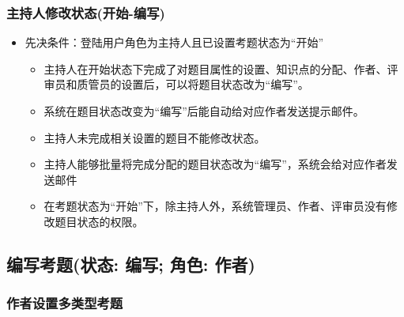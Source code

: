 \documentclass[hyperref, a4paper]{ctexart}
\providecommand{\tightlist}{%
  \setlength{\itemsep}{0pt}\setlength{\parskip}{0pt}}
\begin{document}
\hypertarget{ux4e3bux6301ux4ebaux4feeux6539ux72b6ux6001ux5f00ux59cb-ux7f16ux5199}{%
\subsubsection{主持人修改状态(开始-编写)}\label{ux4e3bux6301ux4ebaux4feeux6539ux72b6ux6001ux5f00ux59cb-ux7f16ux5199}}

\begin{itemize}
\tightlist
\item
  先决条件：登陆用户角色为主持人且已设置考题状态为``开始''

  \begin{itemize}
  \tightlist
  \item
    主持人在开始状态下完成了对题目属性的设置、知识点的分配、作者、评审员和质管员的设置后，可以将题目状态改为``编写''。
  \item
    系统在题目状态改变为``编写''后能自动给对应作者发送提示邮件。
  \item
    主持人未完成相关设置的题目不能修改状态。
  \item
    主持人能够批量将完成分配的题目状态改为``编写''，系统会给对应作者发送邮件
  \item
    在考题状态为``开始''下，除主持人外，系统管理员、作者、评审员没有修改题目状态的权限。
  \end{itemize}
\end{itemize}

\hypertarget{ux7f16ux5199ux8003ux9898ux72b6ux6001-ux7f16ux5199-ux89d2ux8272-ux4f5cux8005}{%
\subsection{编写考题(状态: 编写; 角色:
作者)}\label{ux7f16ux5199ux8003ux9898ux72b6ux6001-ux7f16ux5199-ux89d2ux8272-ux4f5cux8005}}

\hypertarget{ux4f5cux8005ux8bbeux7f6eux591aux7c7bux578bux8003ux9898}{%
\subsubsection{作者设置多类型考题}\label{ux4f5cux8005ux8bbeux7f6eux591aux7c7bux578bux8003ux9898}}
\end{document}
